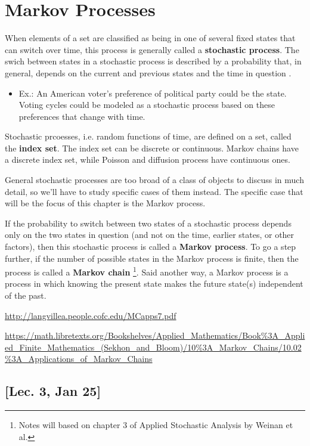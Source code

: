 \chapter{Markov Processes }

When elements of a set are classified as being in one of several fixed states that can switch over time, this process is generally called a \textbf{stochastic process}. The swich between states in a stochastic process is described by a probability that, in general, depends on the current and previous states and the time in question \cite{friedberg2013linear}. 
\begin{itemize}
	\item Ex.: An American voter's preference of political party could be the state. Voting cycles could be modeled as a stochastic process based on these preferences that change with time. 
\end{itemize}

Stochastic prcoesses, i.e. random functions of time, are defined on a set, called the \textbf{index set}. The index set can be discrete or continuous. Markov chains have a discrete index set, while Poisson and diffusion process have continuous ones. 

General stochastic processes are too broad of a class of objects to discuss in much detail, so we'll have to study specific cases of them instead. The specific case that will be the focus of this chapter is the Markov process.   

If the probability to switch between two states of a stochastic process depends only on the two states in question (and not on the time, earlier states, or other factors), then this stochastic process is called a \textbf{Markov process}. To go a step further, if the number of possible states in the Markov process is finite, then the process is called a \textbf{Markov chain} \footnote{Notes will based on chapter 3 of Applied Stochastic Analysis by Weinan et al.}\cite{weinan2019applied}.  Said another way, a Markov process is a process in which knowing the present state makes the future state(s) independent of the past. 

\url{http://langvillea.people.cofc.edu/MCapps7.pdf}

\url{https://math.libretexts.org/Bookshelves/Applied_Mathematics/Book%3A_Applied_Finite_Mathematics_(Sekhon_and_Bloom)/10%3A_Markov_Chains/10.02%3A_Applications_of_Markov_Chains}

\section{[Lec. 3, Jan 25]}


